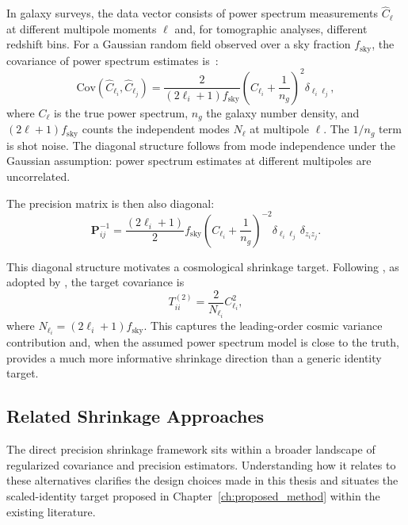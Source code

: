 In galaxy surveys, the data vector consists of power spectrum measurements $\hat{C}_\ell$ at different multipole moments $\ell$ and, for tomographic analyses, different redshift bins. For a Gaussian random field observed over a sky fraction $f_{\text{sky}}$, the covariance of power spectrum estimates is~\citep{pope2008shrinkage}:
\begin{equation}
\label{eq:cosmo_cov}
\text{Cov}(\hat{C}_{\ell_i}, \hat{C}_{\ell_j}) = \frac{2}{(2\ell_i + 1) f_{\text{sky}}} \left(C_{\ell_i} + \frac{1}{n_g}\right)^2 \delta_{\ell_i \ell_j},
\end{equation}
where $C_{\ell}$ is the true power spectrum, $n_g$ the galaxy number density, and $(2\ell+1)f_{\text{sky}}$ counts the independent modes $N_\ell$ at multipole $\ell$. The $1/n_g$ term is shot noise. The diagonal structure follows from mode independence under the Gaussian assumption: power spectrum estimates at different multipoles are uncorrelated.

The precision matrix is then also diagonal:
\begin{equation}
\label{eq:cosmo_precision}
\mathbf{P}_{ij}^{-1} = \frac{(2\ell_i + 1)}{2} f_{\text{sky}} \left(C_{\ell_i} + \frac{1}{n_g}\right)^{-2} \delta_{\ell_i \ell_j} \, \delta_{z_i z_j}.
\end{equation}

This diagonal structure motivates a cosmological shrinkage target. Following \citep{pope2008shrinkage}, as adopted by \citep{looijmans2024comparison}, the target covariance is
\begin{equation}
\label{eq:cosmo_target}
T^{(2)}_{ii} = \frac{2}{N_{\ell_i}} C_{\ell_i}^2,
\end{equation}
where $N_{\ell_i} = (2\ell_i + 1) f_{\text{sky}}$. This captures the leading-order cosmic variance contribution and, when the assumed power spectrum model is close to the truth, provides a much more informative shrinkage direction than a generic identity target.

\subsection{Related Shrinkage Approaches}
\label{sec:related}

The direct precision shrinkage framework sits within a broader landscape of regularized covariance and precision estimators. Understanding how it relates to these alternatives clarifies the design choices made in this thesis and situates the scaled-identity target proposed in Chapter~\ref{ch:proposed_method} within the existing literature.

